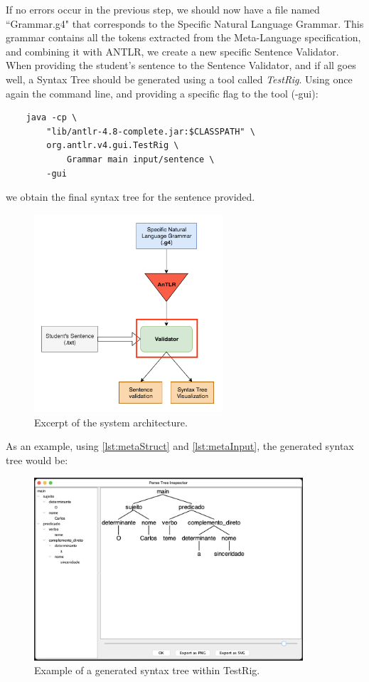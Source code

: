 If no errors occur in the previous step, we should now have a file named ``Grammar.g4" that corresponds to the Specific Natural Language Grammar.
This grammar contains all the tokens extracted from the Meta-Language specification, and combining it with ANTLR, we create a new specific Sentence Validator.
When providing the student's sentence to the Sentence Validator, and if all goes well, a Syntax Tree should be generated using a tool called \emph{TestRig}.
Using once again the command line, and providing a specific flag to the tool (-gui):
\begin{Verbatim}
	java -cp \ 
		"lib/antlr-4.8-complete.jar:$CLASSPATH" \ 
		org.antlr.v4.gui.TestRig \ 
			Grammar main input/sentence \ 
		-gui
\end{Verbatim}
\noindent we obtain the final syntax tree for the sentence provided. 
\begin{figure}[h]
    \centering
    \includegraphics[width=7cm]{images/system_sentence_validator.png}
    \caption{Excerpt of the system architecture.}
    \label{fig:system_architecture}
\end{figure}

As an example, using \autoref{lst:metaStruct} and \autoref{lst:metaInput}, the generated syntax tree would be:
\begin{figure}[h]
    \centering
    \includegraphics[width=10cm]{images/testrig_gui_example.png}
    \caption{Example of a generated syntax tree within TestRig.}
    \label{fig:system_architecture}
\end{figure}



